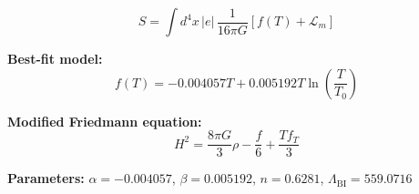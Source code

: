 
\begin{equation}
  S = \int d^4x \, |e| \, \frac{1}{16\pi G} \left[ f(T) + \mathcal{L}_m \right]
\end{equation}

\textbf{Best-fit model:}
\begin{equation}
  f(T) = -0.004057 T + 0.005192 T \ln\!\left(\frac{T}{T_0}\right)
\end{equation}

\textbf{Modified Friedmann equation:}
\begin{equation}
  H^2 = \frac{8\pi G}{3} \rho - \frac{f}{6} + \frac{T f_T}{3}
\end{equation}

\textbf{Parameters:}
$\alpha = -0.004057$, \quad
$\beta = 0.005192$, \quad
$n = 0.6281$, \quad
$\Lambda_{\text{BI}} = 559.0716$